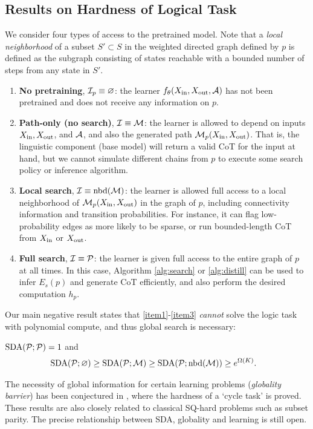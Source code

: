 \subsection{Results on Hardness of Logical Task}

We consider four types of access to the pretrained model. Note that a \emph{local neighborhood} of a subset $S'\subset S$ in the weighted directed graph defined by $p$ is defined as the subgraph consisting of states reachable with a bounded number of steps from any state in $S'$.

\begin{enumerate}
\item\label{item1} \textbf{No pretraining}, $\mathcal{I}_p\equiv\varnothing$: the learner $f_\theta(X_{\operatorname{in}},X_{\operatorname{out}},\mathcal{A})$ has not been pretrained and does not receive any information on $p$.

\item\label{item2} \textbf{Path-only (no search)}, $\mathcal{I}\equiv\mathcal{M}$: the learner is allowed to depend on inputs $X_{\operatorname{in}},X_{\operatorname{out}}$, and $\mathcal{A}$, and also the generated path $\mathcal{M}_p(X_{\operatorname{in}},X_{\operatorname{out}})$. That is, the linguistic component (base model) will return a valid CoT for the input at hand, but we cannot simulate different chains from $p$ to execute some search policy or inference algorithm.

\item\label{item3} \textbf{Local search}, $\mathcal{I}\equiv \operatorname{nbd}(\mathcal{M})$: the learner is allowed full access to a local neighborhood of $\mathcal{M}_p(X_{\operatorname{in}},X_{\operatorname{out}})$ in the graph of $p$, including connectivity information and transition probabilities. For instance, it can flag low-probability edges as more likely to be sparse, or run bounded-length CoT from $X_{\operatorname{in}}$ or $X_{\operatorname{out}}$. 

\item\label{item4} \textbf{Full search}, $\mathcal{I}\equiv\mathcal{P}$: the learner is given full access to the entire graph of $p$ at all times. In this case, Algorithm \ref{alg:search} or \ref{alg:distill} can be used to infer $E_s(p)$ and generate CoT efficiently, and also perform the desired computation $h_p$.
\end{enumerate}

Our main negative result states that \ref{item1}-\ref{item3} \emph{cannot} solve the logic task with polynomial compute, and thus global search is necessary:

\begin{thm}\label{thm:sqexp}
$\operatorname{SDA}(\mathcal{P};\mathcal{P})=1$ and
\begin{align*}
&\operatorname{SDA}(\mathcal{P};\varnothing) \ge \operatorname{SDA}(\mathcal{P};\mathcal{M}) \ge \operatorname{SDA}(\mathcal{P};\operatorname{nbd}(\mathcal{M})) \ge e^{\Omega(K)}.
\end{align*}
\end{thm}
\begin{rmk}
The necessity of global information for certain learning problems (\emph{globality barrier}) has been conjectured in \citet{abbe2024far}, where the hardness of a `cycle task' is proved. These results are also closely related to classical SQ-hard problems such as subset parity. The precise relationship between SDA, globality and learning is still open.
\end{rmk}

